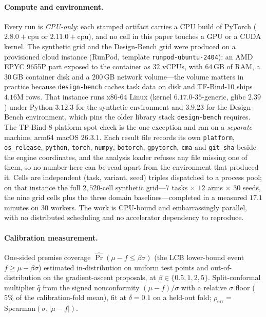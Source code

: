 \documentclass[letterpaper]{article}
\theoremstyle{plain}
\begin{document}
\paragraph{Compute and environment.} Every run is \emph{CPU-only}: each stamped artifact carries a CPU build of PyTorch ($2.8.0{+}$cpu or $2.11.0{+}$cpu), and no cell in this paper touches a GPU or a CUDA kernel. The synthetic grid and the Design-Bench grid were produced on a provisioned cloud instance (RunPod, template \texttt{runpod-ubuntu-2404}): an AMD EPYC 9655P part exposed to the container as $32$ vCPUs, with $64$\,GB of RAM, a $30$\,GB container disk and a $200$\,GB network volume---the volume matters in practice because \texttt{design-bench} caches task data on disk and TF-Bind-10 ships $4.16$M rows. That instance runs x86-64 Linux (kernel $6.17.0$-$35$-generic, glibc $2.39$) under Python $3.12.3$ for the synthetic environment and $3.9.23$ for the Design-Bench environment, which pins the older library stack \texttt{design-bench} requires. The TF-Bind-8 platform spot-check is the one exception and ran on a \emph{separate} machine, arm64 macOS $26.3.1$. Each result file records its own \texttt{platform}, \texttt{os\_release}, \texttt{python}, \texttt{torch}, \texttt{numpy}, \texttt{botorch}, \texttt{gpytorch}, \texttt{cma} and \texttt{git\_sha} beside the engine coordinates, and the analysis loader refuses any file missing one of them, so no number here can be read apart from the environment that produced it. Cells are independent (task, variant, seed) triples dispatched to a process pool; on that instance the full $2{,}520$-cell synthetic grid---$7$ tasks $\times$ $12$ arms $\times$ $30$ seeds, the nine grid cells plus the three domain baselines---completed in a measured $17.1$ minutes on $30$ workers. The work is CPU-bound and embarrassingly parallel, with no distributed scheduling and no accelerator dependency to reproduce.

\paragraph{Calibration measurement.} One-sided premise coverage $\widehat{\Pr}(\mu-f\le\beta\sigma)$ (the LCB lower-bound event $f\ge\mu-\beta\sigma$) estimated in-distribution on uniform test points and out-of-distribution on the gradient-ascent proposals, at $\beta\in\{0.5,1,2,5\}$. Split-conformal multiplier $\hat q$ from the signed nonconformity $(\mu-f)/\sigma$ with a relative $\sigma$ floor ($5\%$ of the calibration-fold mean), fit at $\delta{=}0.1$ on a held-out fold; $\rho_{\text{err}}=$ Spearman$(\sigma,|\mu-f|)$.


\end{document}

